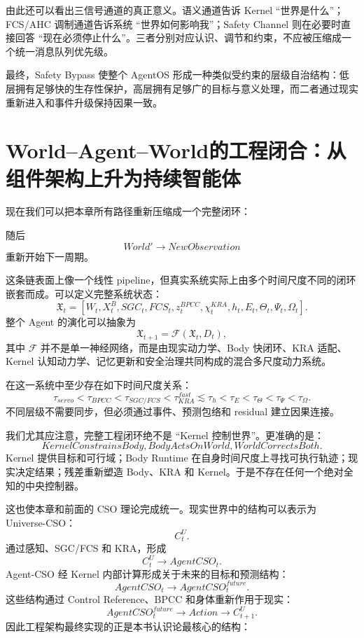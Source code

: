 由此还可以看出三信号通道的真正意义。语义通道告诉 Kernel ``世界是什么''；FCS/AHC 调制通道告诉系统 ``世界如何影响我''；Safety Channel 则在必要时直接回答 ``现在必须停止什么''。三者分别对应认识、调节和约束，不应被压缩成一个统一消息队列优先级。

最终，Safety Bypass 使整个 AgentOS 形成一种类似受约束的层级自治结构：低层拥有足够快的生存性保护，高层拥有足够广的目标与意义处理，而二者通过现实重新进入和事件升级保持因果一致。


\section{World--Agent--World的工程闭合：从组件架构上升为持续智能体}

现在我们可以把本章所有路径重新压缩成一个完整闭环：
\begin{statementbox}
\centering
{}
\end{statementbox}
随后
\[
World'
\rightarrow
NewObservation
\]
重新开始下一周期。

这条链表面上像一个线性 pipeline，但真实系统实际上由多个时间尺度不同的闭环嵌套而成。可以定义完整系统状态：
\[
\mathfrak X_t
=
\left[
W_t,
X^B_t,
SGC_t,
FCS_t,
z^{BPCC}_t,
\chi^{KRA}_t,
h_t,
E_t,
\Theta_t,
\Psi_t,
\Omega_t
\right].
\]
整个 Agent 的演化可以抽象为
\[
\mathfrak X_{t+1}
=
\mathcal F
\left(
\mathfrak X_t,
D_t
\right),
\]
其中 $\mathcal F$ 并不是单一神经网络，而是由现实动力学、Body 快闭环、KRA 适配、Kernel 认知动力学、记忆更新和安全治理共同构成的混合多尺度动力系统。

在这一系统中至少存在如下时间尺度关系：
\[
\boxed{
\tau_{servo}
<
\tau_{BPCC}
<
\tau_{SGC/FCS}
<
\tau_{KRA}^{fast}
\lesssim
\tau_h
<
\tau_E
<
\tau_\Theta
<
\tau_\Psi
<
\tau_\Omega .
}
\]
不同层级不需要同步，但必须通过事件、预测包络和 residual 建立因果连接。

我们尤其应注意，完整工程闭环绝不是 ``Kernel 控制世界''。更准确的是：
\[
\boxed{
KernelConstrainsBody,
BodyActsOnWorld,
WorldCorrectsBoth .
}
\]
Kernel 提供目标和可行域；Body Runtime 在自身时间尺度上寻找可执行轨迹；现实决定结果；残差重新塑造 Body、KRA 和 Kernel。于是不存在任何一个绝对全知的中央控制器。

这也使本章和前面的 CSO 理论完成统一。现实世界中的结构可以表示为 Universe-CSO：
\[
C^U_t .
\]
通过感知、SGC/FCS 和 KRA，形成
\[
C^U_t
\rightarrow
AgentCSO_t .
\]
Agent-CSO 经 Kernel 内部计算形成关于未来的目标和预测结构：
\[
AgentCSO_t
\rightarrow
AgentCSO^{future}_t .
\]
这些结构通过 Control Reference、BPCC 和身体重新作用于现实：
\[
AgentCSO^{future}_t
\rightarrow
Action
\rightarrow
C^U_{t+1}.
\]
因此工程架构最终实现的正是本书认识论最核心的结构：
\begin{statementbox}
\centering
{}
\end{statementbox}


